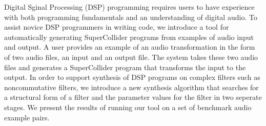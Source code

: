 Digital Sginal Processing (DSP) programming requires users to have experience with both programming fundamentals and an understanding of digital audio.
To assist novice DSP programmers in writing code, we introduce a tool for automatically generating SuperCollider programs from examples of audio input and output.
A user provides an example of an audio transformation in the form of two audio files, an input and an output file.
The system takes these two audio files and generates a SuperCollider program that transforms the input to the output.
In order to support synthesis of DSP programs on complex filters such as noncommutative filters, we introduce a new synthesis algorithm that searches for a structural form of a filter and the parameter values for the filter in two seperate stages.
We present the results of running our tool on a set of benchmark audio example pairs.
